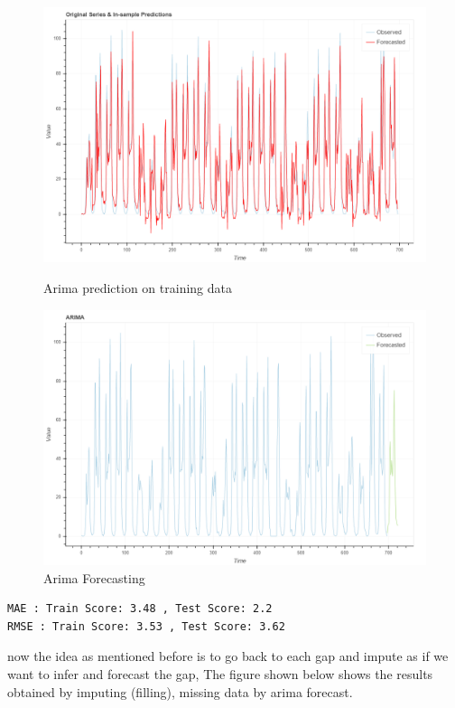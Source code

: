 \begin{figure}[H]
\centering
\begin{minipage}{.49\linewidth}
    \includegraphics[width=.9\textwidth]{img/arima_training.png}    
    \caption{Arima prediction on training data}
    \label{fig:trainig_arima}
\end{minipage}
\hfill
\begin{minipage}{.49\linewidth}
    \includegraphics[width=.9\textwidth]{img/arima_forcasting.png} 
    \caption{Arima Forecasting}
    \label{fig:forcasting}
\end{minipage}
\end{figure}

%
\begin{verbatim}
MAE : Train Score: 3.48 , Test Score: 2.2
RMSE : Train Score: 3.53 , Test Score: 3.62
\end{verbatim}



now the idea as mentioned before is to go back to each gap and impute as if we want to infer and forecast the gap, The figure shown below shows the results obtained by imputing (filling), missing data by arima forecast.

